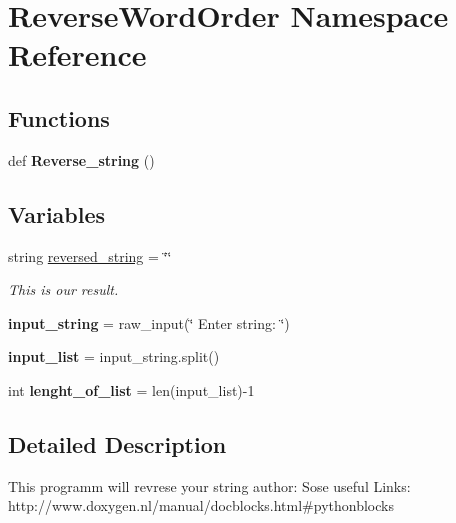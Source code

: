 \hypertarget{namespaceReverseWordOrder}{}\section{Reverse\+Word\+Order Namespace Reference}
\label{namespaceReverseWordOrder}
\subsection*{Functions}
\begin{DoxyCompactItemize}
\item 
\mbox{\label{namespaceReverseWordOrder_adaa88341f348734451cbf1af71472b42}} 
def {\bfseries Reverse\+\_\+string} ()
\end{DoxyCompactItemize}
\subsection*{Variables}
\begin{DoxyCompactItemize}
\item 
\mbox{\label{namespaceReverseWordOrder_afa3b7862672124c31e27b322a44e3612}} 
string \hyperlink{namespaceReverseWordOrder_afa3b7862672124c31e27b322a44e3612}{reversed\+\_\+string} = \char`\"{}\char`\"{}
\begin{DoxyCompactList}\small\item\em This is our result. \end{DoxyCompactList}\item 
\mbox{\label{namespaceReverseWordOrder_a453ad62bf05c7147a791c27e881574ae}} 
{\bfseries input\+\_\+string} = raw\+\_\+input(\char`\"{} Enter string\+: \char`\"{})
\item 
\mbox{\label{namespaceReverseWordOrder_a22fe98def052192b19d398b985c59619}} 
{\bfseries input\+\_\+list} = input\+\_\+string.\+split()
\item 
\mbox{\label{namespaceReverseWordOrder_a487ff78d523276e5513481572d54a898}} 
int {\bfseries lenght\+\_\+of\+\_\+list} = len(input\+\_\+list)-\/1
\end{DoxyCompactItemize}


\subsection{Detailed Description}
\begin{DoxyVerb}This programm will revrese your string
author: Sose
useful Links: http://www.doxygen.nl/manual/docblocks.html#pythonblocks\end{DoxyVerb}
 